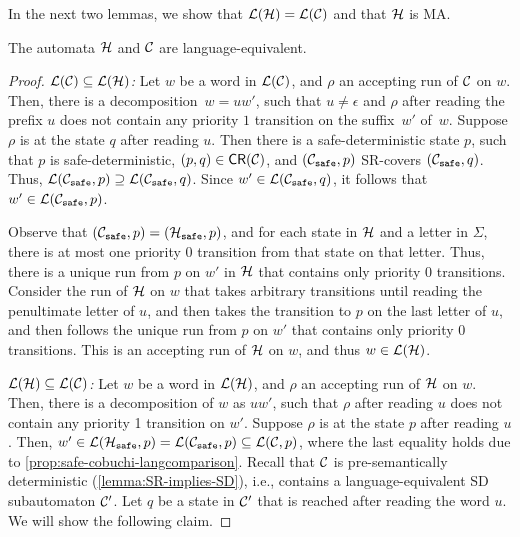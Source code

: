 In the next two lemmas, we show that $\mathcal{L}(\mathcal{H})=\mathcal{L}(\mathcal{C})$ and that $\mathcal{H}$ is MA.

\begin{lemma}\label{lemma:cobuchi-lang-equivalence}
    The automata $\mathcal{H}$ and $\mathcal{C}$ are language-equivalent.
\end{lemma}
\begin{proof}
    \textit{{$\mathcal{L}(\mathcal{C}) \subseteq \mathcal{L}(\mathcal{H})$}:} Let $w$ be a word in $\mathcal{L}(\mathcal{C})$, and $\rho$ an accepting run of $\mathcal{C}$ on $w$. Then, there is a decomposition~$w=uw'$, such that $u \neq \epsilon$ and $\rho$ after reading the prefix $u$ does not contain any priority $1$ transition on the suffix~$w'$ of~$w$. 
    Suppose $\rho$ is at the state $q$ after reading $u$. Then there is a safe-deterministic state $p$, such that $p$ is safe-deterministic, $(p,q) \in {\mathsf{CR}}(\mathcal{C})$, and $(\mathcal{C}_{\texttt{safe}},p)$ SR-covers $(\mathcal{C}_{\texttt{safe}},q)$. Thus, $\mathcal{L}(\mathcal{C}_{\texttt{safe}},p)\supseteq \mathcal{L}(\mathcal{C}_{\texttt{safe}},q)$. Since $w' \in \mathcal{L}(\mathcal{C}_{\texttt{safe}},q)$, it follows that $w' \in \mathcal{L}(\mathcal{C}_{\texttt{safe}},p)$.
    
    Observe that $(\mathcal{C}_{\texttt{safe}},p)=(\mathcal{H}_{\texttt{safe}},p)$, and for each state in $\mathcal{H}$ and a letter in $\Sigma$, there is at most one priority 0 transition from that state on that letter. Thus, there is a unique run from $p$ on $w'$ in $\mathcal{H}$ that contains only priority 0 transitions. Consider the run of $\mathcal{H}$ on $w$ that takes arbitrary transitions until reading the penultimate letter of $u$, and then takes the transition to $p$ on the last letter of $u$, and then follows the unique run from $p$ on $w'$ that contains only priority 0 transitions. This is an accepting run of $\mathcal{H}$ on $w$, and thus $w \in \mathcal{L}(\mathcal{H})$.
    
    \textit{{$\mathcal{L}(\mathcal{H}) \subseteq \mathcal{L}(\mathcal{C})$}:} Let $w$ be a word in $\mathcal{L}(\mathcal{H})$, and $\rho$ an accepting run of $\mathcal{H}$ on $w$. Then, there is a decomposition of $w$ as $uw'$, such that $\rho$ after reading $u$ does not contain any priority 1 transition on $w'$. Suppose $\rho$ is at the state $p$ after reading $u$. Then, $w' \in \mathcal{L}(\mathcal{H}_{\texttt{safe}},p) = \mathcal{L}(\mathcal{C}_{\texttt{safe}},p) \subseteq \mathcal{L}(\mathcal{C},p)$, where the last equality holds due to \cref{prop:safe-cobuchi-langcomparison}. Recall that $\mathcal{C}$ is pre-semantically deterministic (\cref{lemma:SR-implies-SD}), i.e., contains a language-equivalent SD subautomaton $\mathcal{C}'$. Let $q$ be a state in $\mathcal{C}'$ that is reached after reading the word $u$. We will show the following claim.


\end{proof}
